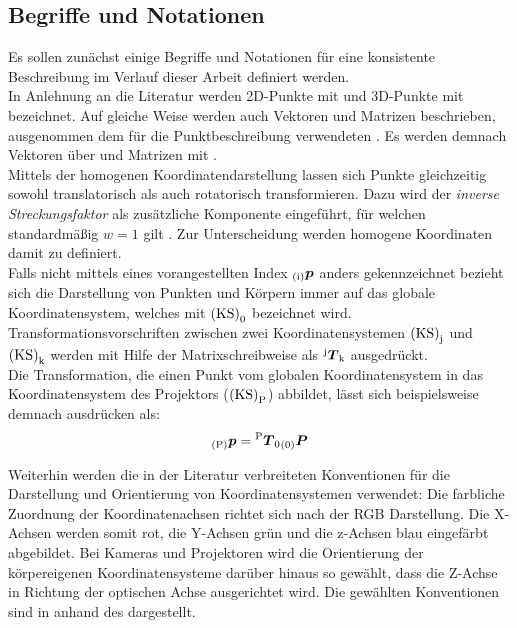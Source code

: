 \subsection{Begriffe und Notationen}
Es sollen zunächst einige Begriffe und Notationen für eine konsistente Beschreibung im Verlauf dieser Arbeit definiert werden.\\
In Anlehnung an die Literatur \cite{Zhang2000} werden 2D-Punkte mit  und 3D-Punkte mit  bezeichnet. Auf gleiche Weise werden auch Vektoren und Matrizen beschrieben, ausgenommen dem für die Punktbeschreibung verwendeten \red[Buchstaben P]. Es werden demnach Vektoren über  und Matrizen mit  \red[beschrieben].\\
Mittels der homogenen Koordinatendarstellung lassen sich Punkte gleichzeitig sowohl translatorisch als auch rotatorisch transformieren. Dazu wird der \textit{inverse Streckungsfaktor} als zusätzliche Komponente eingeführt, für welchen standardmäßig $w=1$ gilt \cite{Nischwitz20111}. Zur Unterscheidung werden homogene Koordinaten damit zu  \red[bzw.]  definiert.\\
Falls nicht mittels eines vorangestellten Index ${_{{\mathrm{(i)}}}}\mbox{\boldmath{$p$}}$ anders gekennzeichnet bezieht sich die Darstellung von Punkten und Körpern immer auf das globale Koordinatensystem, welches mit ${\mathrm{(KS)}}_{\mathrm{0}}$ bezeichnet wird. Transformationsvorschriften zwischen zwei Koordinatensystemen ${\mathrm{(KS)}}_{\mathrm{j}}$ und ${\mathrm{(KS)}}_{\mathrm{k}}$ werden mit Hilfe der Matrixschreibweise als ${^{\mathrm{j}}\mbox{\boldmath{$T$}}_{\mathrm{k}}}$ ausgedrückt.\\
Die Transformation, die einen Punkt vom globalen Koordinatensystem in das Koordinatensystem des Projektors (${\mathrm{(KS)}}_{\mathrm{P}}$) abbildet, lässt sich beispielsweise demnach ausdrücken als:
\red[\\P oder p? in 0]
\begin{equation}
{_{{\mathrm{(P)}}}}\mbox{\boldmath{$p$}} = {^{\mathrm{P}}\mbox{\boldmath{$T$}}_{\mathrm{0}}}{_{{\mathrm{(0)}}}}\mbox{\boldmath{$P$}}
\end{equation}

Weiterhin werden die in der Literatur verbreiteten Konventionen für die Darstellung und Orientierung von Koordinatensystemen verwendet: Die farbliche Zuordnung der Koordinatenachsen richtet sich nach der RGB Darstellung. Die X-Achsen werden somit rot, die Y-Achsen grün und die z-Achsen blau eingefärbt abgebildet. Bei Kameras und Projektoren wird die Orientierung der körpereigenen Koordinatensysteme darüber hinaus so gewählt, dass die Z-Achse in Richtung der optischen Achse ausgerichtet wird. Die gewählten Konventionen sind in  anhand des  dargestellt.

